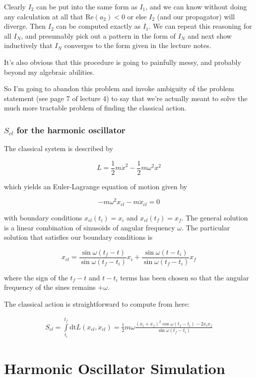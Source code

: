 \documentclass[12pt]{article}
\begin{document}
Clearly \(I_2\) can be put into the same form as \(I_1\), and we can know without doing any calculation at all that \(\mathrm{Re}(a_2)<0\) or else \(I_2\) (and our propagator) will diverge. Then \(I_2\) can be computed exactly as \(I_1\). We can repeat this reasoning for all \(I_N\), and presumably pick out a pattern in the form of \(I_N\) and next show inductively that \(I_N\) converges to the form given in the lecture notes.

It's also obvious that this procedure is going to painfully messy, and probably beyond my algebraic abilities.

So I'm going to abandon this problem and invoke ambiguity of the problem statement (see page 7 of lecture 4) to say that we're actually meant to solve the much more tractable problem of finding the classical action.

\subsubsection*{\(S_{cl}\) for the harmonic oscillator}

The classical system is described by

\[L = \frac{1}{2}m\dot{x}^2 - \frac{1}{2}m\omega^2 x^2
\]

which yields an Euler-Lagrange equation of motion given by

\[-m\omega^2 x_{cl} - m\ddot{x}_{cl} = 0
\]

with boundary conditions \(x_{cl}(t_i) = x_i\) and \(x_{cl}(t_f) = x_f\). The general solution is a linear combination of sinusoids of angular frequency \(\omega\). The particular solution that satisfies our boundary conditions is

\[x_{cl} = \frac{\sin\omega(t_f-t)}{\sin\omega(t_f-t_i)}x_i + \frac{\sin\omega(t-t_i)}{\sin\omega(t_f-t_i)}x_f
\]

where the sign of the \( t_f -t \) and \( t - t_i \) terms has been chosen so that the angular frequency of the sines remains \(+\omega\).

The classical action is straightforward to compute from here:

\begin{align*}
S_{cl} = \int\limits_{t_i}^{t_f}\mathrm{dt}L(x_{cl},\dot{x}_{cl}) = \frac{1}{2}m\omega\frac{(x_i+x_f)^2\cos\omega(t_f-t_i) - 2x_ix_f}{\sin\omega(t_f-t_i)}
\end{align*}

\section{Harmonic Oscillator Simulation}
\end{document}
